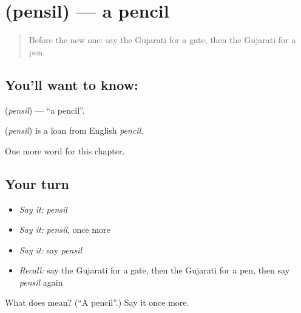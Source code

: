 \section[\texorpdfstring{\gu{પેન્સિલ} (pensil)}{પેન્સિલ (pensil)}]{ (pensil) — a pencil}

\label{lesson:GU-C129-pensil}



\begin{quote}
Before the new one: say the Gujarati for a gate, then the Gujarati for a pen.
\end{quote}

\subsection*{You'll want to know: }
\textbf{} (\emph{pensil}) — \textquotedblleft{}a pencil\textquotedblright{}.

\begin{cousinweb}
\textbf{} (\emph{pensil}) is a loan from English \emph{pencil}.
\end{cousinweb}

\begin{grammarlens}[title={What you've built}]
One more word for this chapter.
\end{grammarlens}

\subsection*{Your turn}
\begin{itemize}
\raggedright
  \item \emph{Say it:} \emph{pensil}
  \item \emph{Say it:} \emph{pensil}, once more
  \item \emph{Say it:} say \emph{pensil}
  \item \emph{Recall:} say the Gujarati for a gate, then the Gujarati for a pen, then say \emph{pensil} again
\end{itemize}

\begin{tcolorbox}[breakable,colback=teal!4,colframe=teal!35!black,title={Before you move on}]
What does  mean? (\textquotedblleft{}A pencil\textquotedblright{}.) Say it once more.
\end{tcolorbox}
